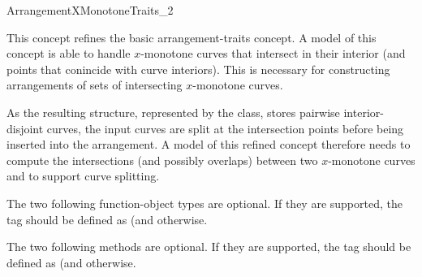 
\ccRefPageBegin
\begin{ccRefConcept}{ArrangementXMonotoneTraits_2}

\ccThreeToTwo

\ccDefinition
This concept refines the basic arrangement-traits concept. A model of
this concept is able to handle $x$-monotone curves that intersect in
their interior (and points that conincide with curve interiors). This
is necessary for constructing arrangements of sets of intersecting
$x$-monotone curves.

As the resulting structure, represented by the  class,
stores pairwise interior-disjoint curves, the input curves are split at
the intersection points before being inserted into the arrangement. 
A model of this refined concept therefore needs to compute the intersections
(and possibly overlaps) between two $x$-monotone curves and to support
curve splitting.

\ccRefines
{}

\ccTypes

\ccThreeToTwo
{}
\ccGlue
{}

The two following function-object types are optional. If they are
supported, the  tag should be defined as
 (and  otherwise.

\ccGlue
{}

\ccThreeToTwo


 {}
\ccGlue
{} {}

The two following methods are optional. If they are supported, 
the  tag should be defined as  (and
 otherwise.


\end{ccRefConcept}
